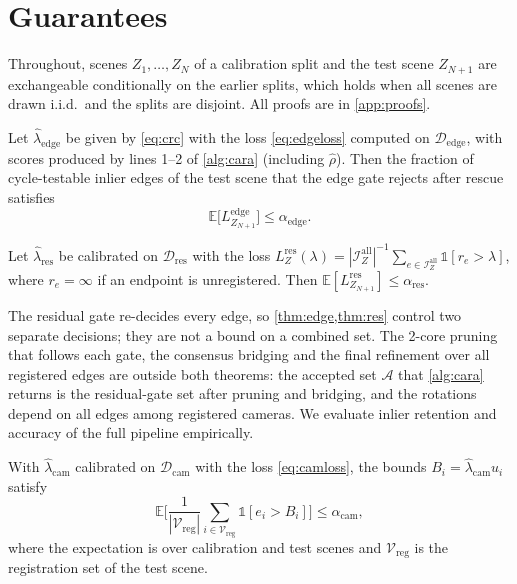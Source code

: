 \section{Guarantees}\label{sec:theory}

Throughout, scenes $Z_1,\dots,Z_N$ of a calibration split and the test scene $Z_{N+1}$ are exchangeable conditionally on the earlier splits, which holds when all scenes are drawn i.i.d.\ and the splits are disjoint. All proofs are in \ref{app:proofs}.

\begin{theorem}\label{thm:edge}
Let $\hat\lambda_{\mathrm{edge}}$ be given by \eqref{eq:crc} with the loss \eqref{eq:edgeloss} computed on $\mathcal{D}_{\mathrm{edge}}$, with scores produced by lines 1--2 of \cref{alg:cara} (including $\hat\rho$). Then the fraction of cycle-testable inlier edges of the test scene that the edge gate rejects after rescue satisfies
\[
\mathbb{E}\big[L^{\mathrm{edge}}_{Z_{N+1}}\big]\le\alpha_{\mathrm{edge}}.
\]
\end{theorem}

\begin{theorem}\label{thm:res}
Let $\hat\lambda_{\mathrm{res}}$ be calibrated on $\mathcal{D}_{\mathrm{res}}$ with the loss $L^{\mathrm{res}}_Z(\lambda)=|\mathcal{I}^{\mathrm{all}}_Z|^{-1}\sum_{e\in\mathcal{I}^{\mathrm{all}}_Z}\mathbb{1}[r_e>\lambda]$, where $r_e=\infty$ if an endpoint is unregistered. Then $\mathbb{E}[L^{\mathrm{res}}_{Z_{N+1}}]\le\alpha_{\mathrm{res}}$.
\end{theorem}

The residual gate re-decides every edge, so \cref{thm:edge,thm:res} control two separate decisions; they are not a bound on a combined set. The 2-core pruning that follows each gate, the consensus bridging and the final refinement over all registered edges are outside both theorems: the accepted set $\mathcal{A}$ that \cref{alg:cara} returns is the residual-gate set after pruning and bridging, and the rotations depend on all edges among registered cameras. We evaluate inlier retention and accuracy of the full pipeline empirically.

\begin{theorem}\label{thm:cam}
With $\hat\lambda_{\mathrm{cam}}$ calibrated on $\mathcal{D}_{\mathrm{cam}}$ with the loss \eqref{eq:camloss}, the bounds $B_i=\hat\lambda_{\mathrm{cam}}u_i$ satisfy
\[
\mathbb{E}\Big[\frac{1}{|\mathcal{V}_{\mathrm{reg}}|}\sum_{i\in\mathcal{V}_{\mathrm{reg}}}\mathbb{1}[e_i>B_i]\Big]\le\alpha_{\mathrm{cam}},
\]
where the expectation is over calibration and test scenes and $\mathcal{V}_{\mathrm{reg}}$ is the registration set of the test scene.
\end{theorem}

